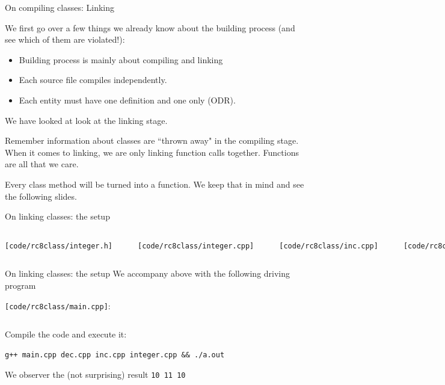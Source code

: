 \begin{frame}{On compiling classes: Linking}

We first go over a few things we already know about the building process (and see which of them are violated!):
\begin{itemize}
\item Building process is mainly about compiling and linking
\item Each source file compiles independently.
\item Each entity must have one definition and one only (ODR).
\end{itemize}

We have looked at  look at the linking stage. 

\vspace{.05in}
Remember information about classes are ``thrown away" in the compiling stage. When it comes to linking, we are only linking function calls together. Functions are all that we care.

\vspace{.05in}	
Every class method will be turned into a function. We keep that in mind and see the following slides.
\end{frame}

\begin{frame}[fragile]{On linking classes: the setup}
\begin{columns}

\vspace{-.25in}
\texttt{[code/rc8class/integer.h]}
\inputminted[fontsize=\small, baselinestretch=.9]{c++}{code/rc8class/integer.h}

\texttt{[code/rc8class/integer.cpp]}
\inputminted[]{c++}{code/rc8class/integer.cpp}


\vspace{-.25in}
\texttt{[code/rc8class/inc.cpp]}
\inputminted[frame=single]{c++}{code/rc8class/inc.cpp}

\texttt{[code/rc8class/dec.cpp]}
\inputminted[frame=single]{c++}{code/rc8class/dec.cpp}
\end{columns}
\end{frame}

\begin{frame}[fragile]{On linking classes: the setup}
We accompany above with the following driving program

\texttt{[code/rc8class/main.cpp]}:
\inputminted[]{c++}{code/rc8class/main.cpp}

Compile the code and execute it:
\begin{verbatim}
g++ main.cpp dec.cpp inc.cpp integer.cpp && ./a.out
\end{verbatim}
We observer the (not surprising) result \texttt{10 11 10}
\end{frame}

